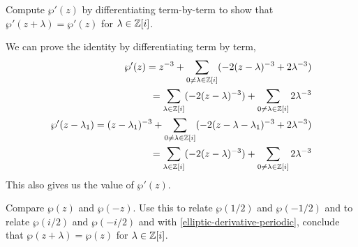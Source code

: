 \documentclass{homework}
\begin{document}
                                                                                                                    \begin{problem}\label{elliptic-derivative-periodic}Compute $\wp'(z)$ by differentiating term-by-term to show that $\wp'(z + \lambda) = \wp'(z)$ for $\lambda \in \mathbb{Z}[i]$.
                                                                                                                    \end{problem}
                                                                                                                    \begin{solution}
                                                                                                                    We can prove the identity by differentiating term by term,
                                                                                                                    \begin{align*}
                                                                                                                    \wp'(z) = z^{-3} + \sum_{0\neq \lambda\in\mathbb{Z}[i]} (-2(z-\lambda)^{-3}  + 2\lambda^{-3})\\
                                                                                                                    = \sum_{\lambda\in\mathbb{Z}[i]}(-2(z-\lambda)^{-3}) + \sum_{0\neq \lambda\in\mathbb{Z}[i]} 2\lambda^{-3}\\
                                                                                                                    \wp'(z-\lambda_1) = (z-\lambda_1)^{-3} + \sum_{0\neq \lambda\in\mathbb{Z}[i]} (-2(z-\lambda-\lambda_1)^{-3}  + 2\lambda^{-3})\\
                                                                                                                    = \sum_{\lambda\in\mathbb{Z}[i]}(-2(z-\lambda)^{-3}) + \sum_{0\neq \lambda\in\mathbb{Z}[i]} 2\lambda^{-3}
                                                                                                                    \end{align*}
                                                                                                                    This also gives us the value of $\wp'(z)$.
                                                                                                                    \end{solution}
                                                                                                                    \begin{problem}
                                                                                                                      Compare $\wp(z)$ and $\wp(-z)$.  Use this to relate $\wp(1/2)$ and $\wp(-1/2)$ and to relate $\wp(i/2)$ and $\wp(-i/2)$ and with \ref{elliptic-derivative-periodic}, conclude that $\wp(z + \lambda) = \wp(z)$ for $\lambda \in \mathbb{Z}[i]$.
                                                                                                                      \end{problem}
\end{document}
